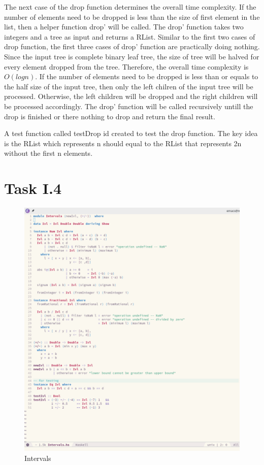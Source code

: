 \documentclass{article}
\begin{document}
\begin{normalsize}
  The next case of the drop function determines the overall time complexity. If
  the number of elements need to be dropped is less than the size of first
  element in the list, then a helper function drop' will be called. The drop'
  function takes two integers and a tree as input and returns a RList. Similar
  to the first two cases of drop function, the first three cases of drop'
  function are practically doing nothing. Since the input tree is complete
  binary leaf tree, the size of tree will be halved for every
  element dropped from the tree. Therefore, the overall time complexity is $O
  (log{}n)$. If the number of elements need to be dropped is 
  less than or equals to the half size of the input tree, then only the left
  chilren of the input tree will be processed. Otherwise, the left children will
  be dropped and the right children will be processed accordingly. The drop'
  function will be called recursively untill the drop is finished or there
  nothing to drop and return the final result.

  A test function called testDrop id created to test the drop function. The key
  idea is the RList which represents n should equal to the RList that represents
  2n without the first n elements.

  \section{Task I.4}
  
  \begin{figure}[H]
    \centering
    \centerline{\includegraphics[scale=0.4]{Intervals}}
    \caption{Intervals}
    \label{fig:intervals}
  \end{figure}
  

\end{normalsize}
\end{document}
